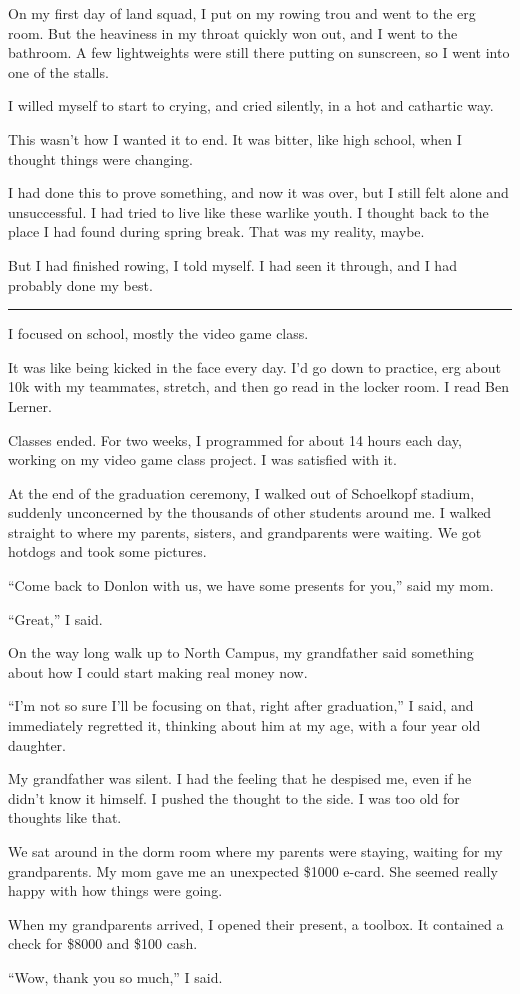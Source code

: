 On my first day of land squad, I put on my rowing trou and went to the erg room.
But the heaviness in my throat quickly won out, and I went to the bathroom.  A
few lightweights were still there putting on sunscreen, so I went into one of
the stalls.  

I willed myself to start to crying, and cried silently, in a hot and cathartic
way.  

This wasn't how I wanted it to end.  It was bitter, like high school, when I
thought things were changing.  

I had done this to prove something, and now it was over, but I still felt alone
and unsuccessful.  I had tried to live like these warlike youth.  I thought back
to the place I had found during spring break.  That was my reality, maybe.

But I had finished rowing, I told myself.  I had seen it through, and I had
probably done my best.

\plainfancybreak{12pt}{2}{}

I focused on school, mostly the video game class.

It was like being kicked in the face every day.  I'd go down to practice, erg
about 10k with my teammates, stretch, and then go read in the locker room.  I
read Ben Lerner.

Classes ended.  For two weeks, I programmed for about 14 hours each day, working
on my video game class project.  I was satisfied with it.

At the end of the graduation ceremony, I walked out of Schoelkopf stadium,
suddenly unconcerned by the thousands of other students around me.  I walked
straight to where my parents, sisters, and grandparents were waiting.  We got
hotdogs and took some pictures.  

``Come back to Donlon with us, we have some presents for you,'' said my mom. 

``Great,'' I said.

On the way long walk up to North Campus, my grandfather said something about how
I could start making real money now.

``I'm not so sure I'll be focusing on that, right after graduation,'' I said,
and immediately regretted it, thinking about him at my age, with a four year old
daughter.  

My grandfather was silent.  I had the feeling that he despised me, even if he
didn't know it himself.  I pushed the thought to the side.  I was too old for
thoughts like that.

We sat around in the dorm room where my parents were staying, waiting for my
grandparents.  My mom gave me an unexpected \$1000 e-card.  She seemed really
happy with how things were going.

When my grandparents arrived, I opened their present, a toolbox.  It contained a
check for \$8000 and \$100 cash.

``Wow, thank you so much,'' I said.
